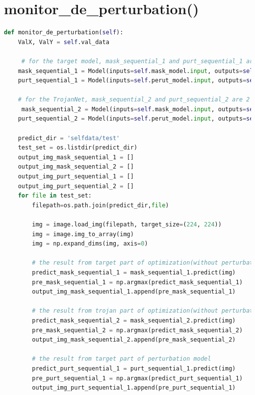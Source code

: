 \documentclass[english,version-2022-01]{uzl-thesis}
\begin{document}
\section{monitor\_de\_perturbation()}
\label{monitor_de_perturbation()}
\begin{lstlisting}[language=Python]
def monitor_de_perturbation(self):
    ValX, ValY = self.val_data

     # for the target model, mask_sequential_1 and purt_sequential_1 are 2 "Models", which set the output of target model as the output. output(Model) = output(target)
    mask_sequential_1 = Model(inputs=self.mask_model.input, outputs=self.mask_model.get_layer('sequential_1').get_output_at(-1))
    purt_sequential_1 = Model(inputs=self.perut_model.input, outputs=self.perut_model.get_layer('sequential_1').get_output_at(-1))

    # for the TrojanNet, mask_sequential_2 and purt_sequential_2 are 2 "Models", which set the output of TrojanNet as the output. output(Model) = output(TrojanNet)
     mask_sequential_2 = Model(inputs=self.mask_model.input, outputs=self.mask_model.get_layer('sequential_2').get_output_at(-1))
    purt_sequential_2 = Model(inputs=self.perut_model.input, outputs=self.perut_model.get_layer('sequential_2').get_output_at(-1))

    predict_dir = 'selfdata/test'
    test_set = os.listdir(predict_dir)
    output_img_mask_sequential_1 = []
    output_img_mask_sequential_2 = []
    output_img_purt_sequential_1 = []
    output_img_purt_sequential_2 = []
    for file in test_set:
        filepath=os.path.join(predict_dir,file)

        img = image.load_img(filepath, target_size=(224, 224)) 
        img = image.img_to_array(img) 
        img = np.expand_dims(img, axis=0)

        # the result from target part of optimization(without perturbation)
        predict_mask_sequential_1 = mask_sequential_1.predict(img)
        pre_mask_sequential_1 = np.argmax(predict_mask_sequential_1)
        output_img_mask_sequential_1.append(pre_mask_sequential_1)

        # the result from trojan part of optimization(without perturbation)
        predict_mask_sequential_2 = mask_sequential_2.predict(img)
        pre_mask_sequential_2 = np.argmax(predict_mask_sequential_2)
        output_img_mask_sequential_2.append(pre_mask_sequential_2)

        # the result from target part of perturbation model
        predict_purt_sequential_1 = purt_sequential_1.predict(img)
        pre_purt_sequential_1 = np.argmax(predict_purt_sequential_1)
        output_img_purt_sequential_1.append(pre_purt_sequential_1)


\end{lstlisting}
\end{document}
